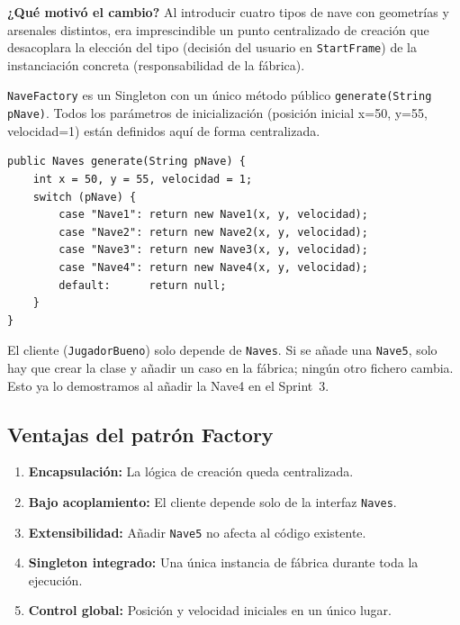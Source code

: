 \documentclass[12pt, a4paper]{article}
\begin{document}
\vspace{0.5em}
\textbf{¿Qu\'{e} motiv\'{o} el cambio?} Al introducir cuatro tipos de nave con geometr\'{i}as y arsenales distintos, era imprescindible un punto centralizado de creaci\'{o}n que desacoplara la elecci\'{o}n del tipo (decisi\'{o}n del usuario en \texttt{StartFrame}) de la instanciaci\'{o}n concreta (responsabilidad de la f\'{a}brica).
 
\vspace{0.5em}
 
\begin{cajafinal}
\texttt{NaveFactory} es un Singleton con un \'{u}nico m\'{e}todo p\'{u}blico \texttt{generate(String pNave)}. Todos los par\'{a}metros de inicializaci\'{o}n (posici\'{o}n inicial x=50, y=55, velocidad=1) est\'{a}n definidos aqu\'{i} de forma centralizada.
 
\begin{lstlisting}
public Naves generate(String pNave) {
    int x = 50, y = 55, velocidad = 1;
    switch (pNave) {
        case "Nave1": return new Nave1(x, y, velocidad);
        case "Nave2": return new Nave2(x, y, velocidad);
        case "Nave3": return new Nave3(x, y, velocidad);
        case "Nave4": return new Nave4(x, y, velocidad);
        default:      return null;
    }
}
\end{lstlisting}
 
El cliente (\texttt{JugadorBueno}) solo depende de \texttt{Naves}. Si se a\~{n}ade una \texttt{Nave5}, solo hay que crear la clase y a\~{n}adir un caso en la f\'{a}brica; ning\'{u}n otro fichero cambia. Esto ya lo demostramos al a\~{n}adir la Nave4 en el Sprint~3.
\end{cajafinal}
 
\subsection{Ventajas del patr\'{o}n Factory}
 
\begin{enumerate}
    \item \textbf{Encapsulaci\'{o}n:} La l\'{o}gica de creaci\'{o}n queda centralizada.
    \item \textbf{Bajo acoplamiento:} El cliente depende solo de la interfaz \texttt{Naves}.
    \item \textbf{Extensibilidad:} A\~{n}adir \texttt{Nave5} no afecta al c\'{o}digo existente.
    \item \textbf{Singleton integrado:} Una \'{u}nica instancia de f\'{a}brica durante toda la ejecuci\'{o}n.
    \item \textbf{Control global:} Posici\'{o}n y velocidad iniciales en un \'{u}nico lugar.
\end{enumerate}
 
\end{document}
